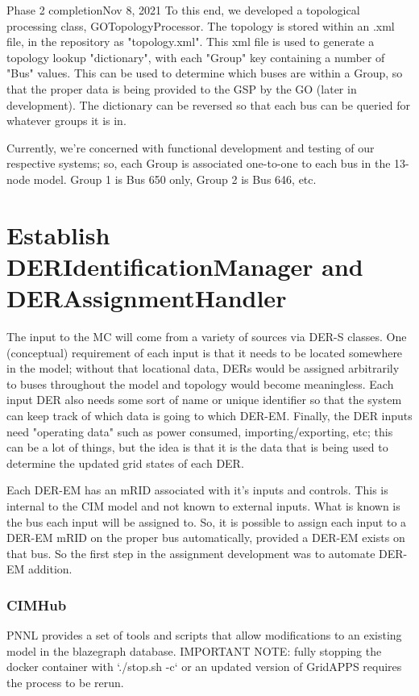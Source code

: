 \begin{entry}{Phase 2 completion}{Nov 8, 2021}
    To this end, we developed a topological processing class, GOTopologyProcessor. The topology is stored within an
    .xml file, in the repository as "topology.xml". This xml file is used to generate a topology lookup "dictionary",
    with each "Group" key containing a number of "Bus" values. This can be used to determine which buses are within
    a Group, so that the proper data is being provided to the GSP by the GO (later in development). The dictionary
    can be reversed so that each bus can be queried for whatever groups it is in.

    Currently, we're concerned with functional development and testing of our respective systems; so, each Group is
    associated one-to-one to each bus in the 13-node model. Group 1 is Bus 650 only, Group 2 is Bus 646, etc.

    \section*{Establish DERIdentificationManager and DERAssignmentHandler}
    The input to the MC will come from a variety of sources via DER-S classes. One (conceptual) requirement of each
    input is that it needs to be located somewhere in the model; without that locational data, DERs would be assigned
    arbitrarily to buses throughout the model and topology would become meaningless. Each input DER also needs some sort
    of name or unique identifier so that the system can keep track of which data is going to which DER-EM. Finally, the
    DER inputs need "operating data" such as power consumed, importing/exporting, etc; this can be a lot of things, but
    the idea is that it is the data that is being used to determine the updated grid states of each DER.

    Each DER-EM has an mRID associated with it's inputs and controls. This is internal to the CIM model and not known to
    external inputs. What is known is the bus each input will be assigned to. So, it is possible to assign each input
    to a DER-EM mRID on the proper bus automatically, provided a DER-EM exists on that bus. So the first step in the
    assignment development was to automate DER-EM addition.

    \subsubsection*{CIMHub}
    PNNL provides a set of tools and scripts that allow modifications to an existing model in the blazegraph database. 
    IMPORTANT NOTE: fully stopping the docker container with `./stop.sh -c` or an updated version of GridAPPS requires
    the process to be rerun.
    

\end{entry}
